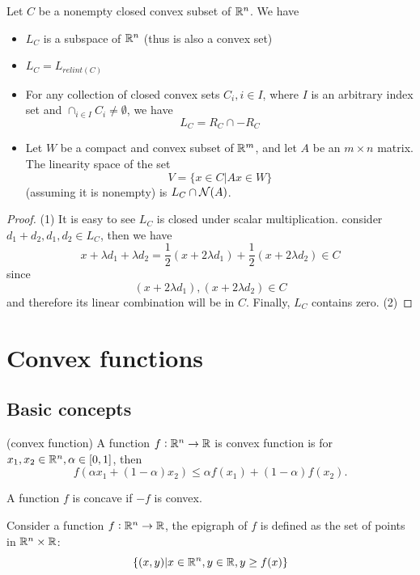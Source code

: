 \begin{refsection}
\begin{theorem}\cite[47]{bertsekas2009convex}
Let $C$ be a nonempty closed convex subset of $\mathbb{R}^n$. We have
\begin{itemize}
    \item $L_C$ is a subspace of $\mathbb{R}^n$ (thus is also a convex set)
    \item $L_C = L_{relint(C)}$
    \item For any collection of closed convex sets $C_i,i\in I$, where $I$ is an arbitrary index set and $\cap_{i\in I} C_i \neq \emptyset$, we have
        $$L_C = R_C \cap -R_C$$
    \item Let $W$ be a compact and convex subset of $\mathbb{R}^m$, and let $A$ be an $m\times n$ matrix. The linearity space of the set
    $$V = \{x\in C| Ax \in W\}$$
    (assuming it is nonempty) is $L_C \cap \mathcal{N}(A)$.
\end{itemize}
\end{theorem}
\begin{proof}
(1) It is easy to see $L_C$ is closed under scalar multiplication. consider $d_1 + d_2, d_1,d_2\in L_C$, then
	we have 
	$$x + \lambda d_1 + \lambda d_2 = \frac{1}{2}(x + 2\lambda d_1) + \frac{1}{2}(x + 2\lambda d_2) \in C$$
	since
	$$(x + 2\lambda d_1), (x + 2\lambda d_2) \in C$$
	and therefore its linear combination will be in $C$. Finally, $L_C$ contains zero. 
(2) 
\end{proof}







\section{Convex functions}
\subsection{Basic concepts}
\begin{definition}
	(convex function) A function $f:\mathbb{R}^n \rightarrow \mathbb{R}$ is convex function is for $x_1,x_2 \in \mathbb{R}^n, \alpha \in [0,1]$, then
	$$f(\alpha x_1 + (1-\alpha) x_2) \leq \alpha f(x_1) + (1-\alpha) f(x_2).$$

A function $f$ is concave if $-f$ is convex.
\end{definition}

\begin{definition}[epigraph]
	Consider a function $f:\mathbb{R}^n \rightarrow \mathbb{R}$, the epigraph of $f$ is defined as the set of points in $\mathbb{R}^n\times \mathbb{R}$:
	$$\{(x,y)|x\in \mathbb{R}^n,y \in \mathbb{R}, y \geq f(x)\}$$
\end{definition}


\end{refsection}
